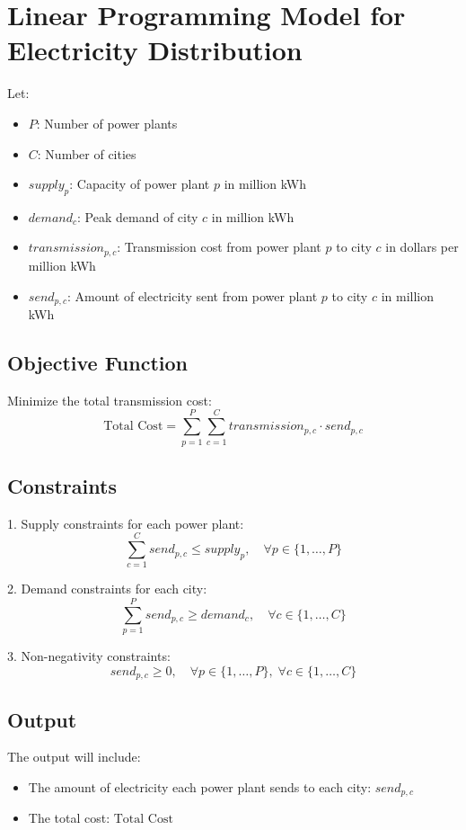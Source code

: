 \documentclass{article}
\begin{document}
\section*{Linear Programming Model for Electricity Distribution}

Let:
\begin{itemize}
    \item \( P \): Number of power plants
    \item \( C \): Number of cities
    \item \( supply_{p} \): Capacity of power plant \( p \) in million kWh
    \item \( demand_{c} \): Peak demand of city \( c \) in million kWh
    \item \( transmission_{p,c} \): Transmission cost from power plant \( p \) to city \( c \) in dollars per million kWh
    \item \( send_{p,c} \): Amount of electricity sent from power plant \( p \) to city \( c \) in million kWh
\end{itemize}

\subsection*{Objective Function}
Minimize the total transmission cost:
\[
\text{Total Cost} = \sum_{p=1}^{P} \sum_{c=1}^{C} transmission_{p,c} \cdot send_{p,c}
\]

\subsection*{Constraints}
1. Supply constraints for each power plant:
\[
\sum_{c=1}^{C} send_{p,c} \leq supply_{p}, \quad \forall p \in \{1, \dots, P\}
\]

2. Demand constraints for each city:
\[
\sum_{p=1}^{P} send_{p,c} \geq demand_{c}, \quad \forall c \in \{1, \dots, C\}
\]

3. Non-negativity constraints:
\[
send_{p,c} \geq 0, \quad \forall p \in \{1, \dots, P\}, \; \forall c \in \{1, \dots, C\}
\]

\subsection*{Output}
The output will include:
\begin{itemize}
    \item The amount of electricity each power plant sends to each city: \( send_{p,c} \)
    \item The total cost: \( \text{Total Cost} \)
\end{itemize}
\end{document}
